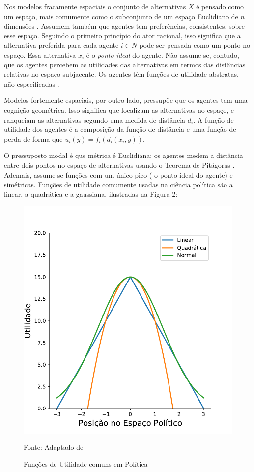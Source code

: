Nos modelos fracamente espaciais o conjunto de alternativas \(X\) é pensado como
um espaço, mais comumente como o subconjunto de um espaço Euclidiano de \(n\)
dimensões \cite{austen1998social}. Assumem também que agentes tem preferências,
consistentes, sobre esse espaço. Seguindo o primeiro princípio do ator racional,
isso significa que a alternativa preferida para cada agente \(i \in N\) pode ser
pensada como um ponto no espaço. Essa alternativa $x_i$ é o \textit{ponto ideal}
do agente. Não assume-se, contudo, que os agentes percebem as utilidades das
alternativas em termos das distâncias relativas no espaço subjacente. Os agentes
têm funções de utilidade abstratas, não especificadas
\cite[p.14]{humphreys2010spatial}.

Modelos fortemente espaciais, por outro lado, pressupõe que os agentes tem uma
cognição geométrica. Isso significa que localizam as alternativas no espaço, e
ranqueiam as alternativas segundo uma medida de distância \(d_i\). A função de
utilidade dos agentes é a composição da função de distância e uma função de
perda de forma que \(u_i(y) = f_i(d_i(x_i,y)) \).

O pressuposto modal  é que métrica é Euclidiana: os agentes
medem a distância entre dois pontos no espaço de alternativas usando o Teorema
de Pitágoras \cite{munger2015choosing}. Ademais, assume-se funções com um único
pico ( o ponto ideal do agente) e simétricas. Funções de utilidade comumente
usadas na ciência política são a linear, a quadrática e a gaussiana, ilustradas
na  Figura 2: 


\begin{figure}[H]
  \centering \includegraphics[scale = 0.7]{ims/utilities.pdf}
  \caption{Funções de Utilidade comuns em Política}
  Fonte: Adaptado de 
\end{figure}

